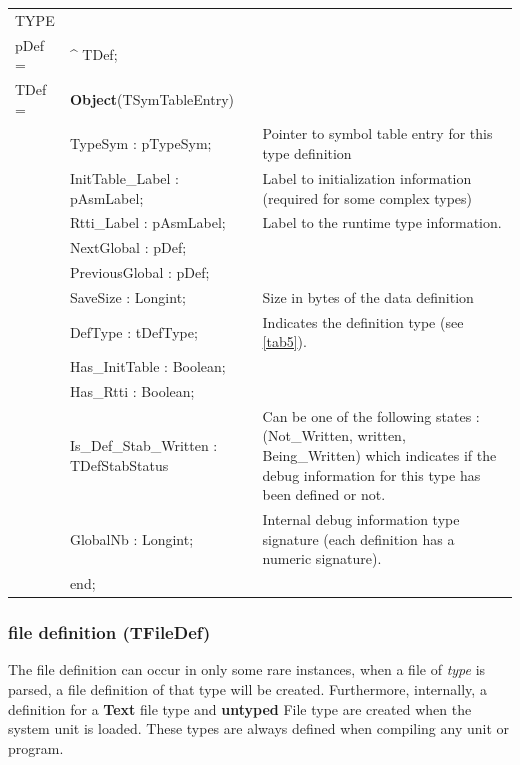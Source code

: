 \documentclass [a4paper,12pt]{article}
\begin{document}
\begin{tabular*}{6.5in}{|l@{\extracolsep{\fill}}lp{7cm}|}
\hline
\textsf{TYPE} & & \\
\xspace pDef = & \^{}  TDef; & \\
\xspace \textsf{TDef} = & \textbf{Object}(TSymTableEntry) & \\
&\textsf{TypeSym : pTypeSym;}&
	Pointer to symbol table entry for this type definition \\
&\textsf{InitTable{\_}Label : pAsmLabel;}&
	Label to initialization information (required for some complex types) \\
&\textsf{Rtti{\_}Label : pAsmLabel;}&
	Label to the runtime type information. \\
&\textsf{NextGlobal : pDef;}&  \\
&\textsf{PreviousGlobal : pDef;}&  \\
&\textsf{SaveSize : Longint;}&
	Size in bytes of the data definition \\
&\textsf{DefType : tDefType;}&
	Indicates the definition type (see \ref{tab5}). \\
&\textsf{Has{\_}InitTable : Boolean;}&  \\
&\textsf{Has{\_}Rtti : Boolean;}&  \\
&\textsf{Is{\_}Def{\_}Stab{\_}Written : TDefStabStatus}&
	Can be one of the following states : (\textsf{Not{\_}Written,
	written, Being{\_}Written}) which indicates if the debug information
	for this type has been defined or not. \\
&\textsf{GlobalNb : Longint;}&
	Internal debug information type signature (each definition has a
	numeric signature). \\
&\textsf{end;}&  \\
\hline
\end{tabular*}

\subsubsection{file definition (TFileDef)}
\label{subsubsec:mylabel6}

The file definition can occur in only some rare instances, when a
\textsf{file of }\textsf{\textit{type}} is parsed, a file definition of that
type will be created. Furthermore, internally, a definition for a
\textbf{Text} file type and \textbf{untyped} File type are created when the
system unit is loaded. These types are always defined when compiling any
unit or program.
\end{document}
